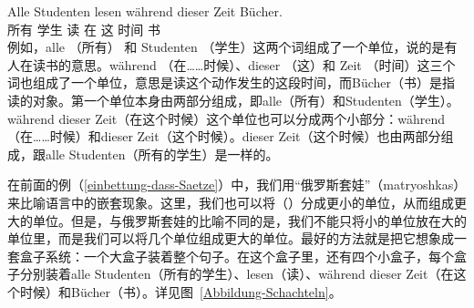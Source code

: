 \ea
\label{Beispiel-Alle-Studenten-lesen}
\gll Alle Studenten lesen während dieser Zeit Bücher.\\
     所有  学生  读  在 这  时间 书\\
\z
例如，alle （所有） 和 Studenten （学生）这两个词组成了一个单位，说的是有人在读书的意思。während （在……时候）、dieser （这）和 Zeit （时间）这三个词也组成了一个单位，意思是读这个动作发生的这段时间，而Bücher（书）是指读的对象。第一个单位本身由两部分组成，即alle（所有）和Studenten（学生）。während dieser Zeit（在这个时候）这个单位也可以分成两个小部分：während（在……时候）和dieser Zeit（这个时候）。dieser Zeit（这个时候）也由两部分组成，跟alle Studenten（所有的学生）是一样的。

在前面的例（\ref{einbettung-dass-Saetze}）中，我们用“俄罗斯套娃”（matryoshkas）来比喻语言中的嵌套现象。这里，我们也可以将（）分成更小的单位，从而组成更大的单位。但是，与俄罗斯套娃的比喻不同的是，我们不能只将小的单位放在大的单位里，而是我们可以将几个单位组成更大的单位。最好的方法就是把它想象成一套盒子系统：一个大盒子装着整个句子。在这个盒子里，还有四个小盒子，每个盒子分别装着alle Studenten（所有的学生）、lesen（读）、während dieser Zeit（在这个时候）和Bücher（书）。详见图~\vref{Abbildung-Schachteln}。

